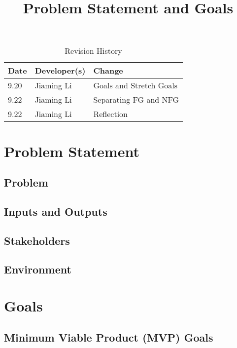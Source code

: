 \documentclass{article}
\title{Problem Statement and Goals\\\progname}
\author{\authname}
\date{}
\begin{document}
    \maketitle

    \begin{table}[hp]
        \caption{Revision History} \label{TblRevisionHistory}
        \begin{tabularx}{\textwidth}{llX}
            \toprule
            \textbf{Date} & \textbf{Developer(s)} & \textbf{Change}\\
            \midrule
            9.20 & Jiaming Li & Goals and Stretch Goals\\
            9.22 & Jiaming Li & Separating FG and NFG\\
            9.22 & Jiaming Li & Reflection\\
            \bottomrule
        \end{tabularx}
    \end{table}

    \section{Problem Statement}

    \subsection{Problem}

    \subsection{Inputs and Outputs}

    \subsection{Stakeholders}

    \subsection{Environment}

    \section{Goals}

    \subsection{Minimum Viable Product (MVP) Goals}
\end{document}
